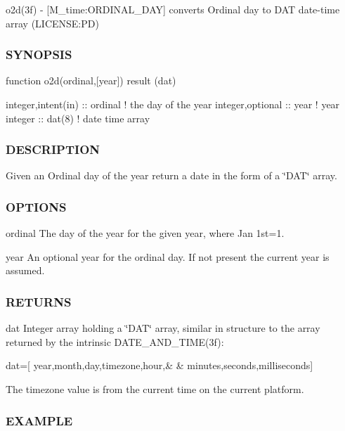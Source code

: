 o2d(3f) -\/ \mbox{[}M\+\_\+time\+:O\+R\+D\+I\+N\+A\+L\+\_\+\+D\+AY\mbox{]} converts Ordinal day to D\+AT date-\/time array (L\+I\+C\+E\+N\+SE\+:PD) 

\subsubsection*{S\+Y\+N\+O\+P\+S\+IS}

\begin{DoxyVerb}function o2d(ordinal,[year]) result (dat)

 integer,intent(in) :: ordinal  ! the day of the year
 integer,optional   :: year     ! year
 integer            :: dat(8)   ! date time array
\end{DoxyVerb}


\subsubsection*{D\+E\+S\+C\+R\+I\+P\+T\+I\+ON}

Given an Ordinal day of the year return a date in the form of a \char`\"{}\+D\+A\+T\char`\"{} array.

\subsubsection*{O\+P\+T\+I\+O\+NS}

ordinal The day of the year for the given year, where Jan 1st=1.

year An optional year for the ordinal day. If not present the current year is assumed.

\subsubsection*{R\+E\+T\+U\+R\+NS}

dat Integer array holding a \char`\"{}\+D\+A\+T\char`\"{} array, similar in structure to the array returned by the intrinsic D\+A\+T\+E\+\_\+\+A\+N\+D\+\_\+\+T\+I\+M\+E(3f)\+:

dat=\mbox{[} year,month,day,timezone,hour,\& \& minutes,seconds,milliseconds\mbox{]}

The timezone value is from the current time on the current platform.

\subsubsection*{E\+X\+A\+M\+P\+LE}


